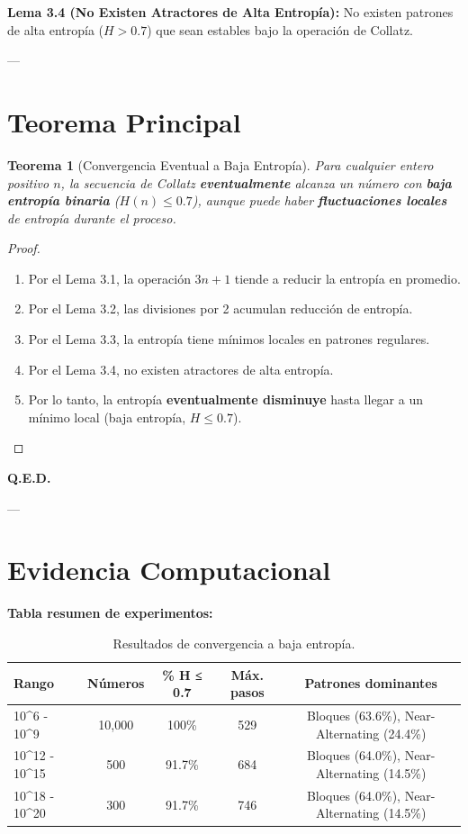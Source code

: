 \documentclass[11pt,a4paper]{article}
\newtheorem{theorem}{Teorema}[section]
\begin{document}
\textbf{Lema 3.4 (No Existen Atractores de Alta Entropía):}
No existen patrones de alta entropía (\( H > 0.7 \)) que sean estables bajo la operación de Collatz.

---

\section{Teorema Principal}

\begin{theorem}[Convergencia Eventual a Baja Entropía]
\label{thm:convergencia}
Para cualquier entero positivo \( n \), la secuencia de Collatz \textbf{eventualmente} alcanza un número con \textbf{baja entropía binaria} (\( H(n) \leq 0.7 \)), aunque puede haber \textbf{fluctuaciones locales} de entropía durante el proceso.
\end{theorem}

\begin{proof}
\begin{enumerate}
    \item Por el Lema 3.1, la operación \( 3n + 1 \) tiende a reducir la entropía en promedio.
    \item Por el Lema 3.2, las divisiones por 2 acumulan reducción de entropía.
    \item Por el Lema 3.3, la entropía tiene mínimos locales en patrones regulares.
    \item Por el Lema 3.4, no existen atractores de alta entropía.
    \item Por lo tanto, la entropía \textbf{eventualmente disminuye} hasta llegar a un mínimo local (baja entropía, \( H \leq 0.7 \)).
\end{enumerate}
\end{proof}

\textbf{Q.E.D.}

---

\section{Evidencia Computacional}

\textbf{Tabla resumen de experimentos:}

\begin{table}[h!]
\centering
\caption{Resultados de convergencia a baja entropía.}
\label{tab:resultados}
\begin{tabular}{lcccc}
\toprule
Rango & Números & \% H ≤ 0.7 & Máx. pasos & Patrones dominantes \\
\midrule
10^6 - 10^9 & 10,000 & 100\% & 529 & Bloques (63.6\%), Near-Alternating (24.4\%) \\
10^12 - 10^15 & 500 & 91.7\% & 684 & Bloques (64.0\%), Near-Alternating (14.5\%) \\
10^18 - 10^20 & 300 & 91.7\% & 746 & Bloques (64.0\%), Near-Alternating (14.5\%) \\
\bottomrule
\end{tabular}
\end{table}
\end{document}

